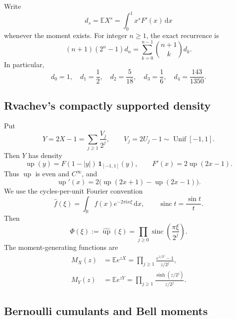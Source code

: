\documentclass[11pt,oneside]{article}
\theoremstyle{definition}
\theoremstyle{remark}
\newcommand{\F}{F}
\newcommand{\Up}{\operatorname{up}}
\newcommand{\E}{\mathbb E}
\newcommand{\R}{\mathbb R}
\newcommand{\dd}{\,\mathrm d}
\newcommand{\ii}{\mathrm i}
\newcommand{\1}{\mathbf 1}
\DeclareMathOperator{\sinc}{sinc}
\begin{document}
Write
\begin{equation}
  d_s=\E X^s=\int_0^1 x^s\F'(x)\dd x
\end{equation}
whenever the moment exists.  For integer \(n\ge1\), the exact recurrence is
\begin{equation}\label{p12:eq:momentrec}
 (n+1)(2^n-1)d_n=\sum_{k=0}^{n-1}\binom{n+1}{k}d_k.
\end{equation}
In particular,
\[
 d_0=1,
 \quad d_1=\frac12,
 \quad d_2=\frac5{18},
 \quad d_3=\frac16,
 \quad d_4=\frac{143}{1350}.
\]

\subsection{Rvachev's compactly supported density}

Put
\begin{equation}\label{p12:eq:Ydef}
 Y=2X-1=\sum_{j\ge1}\frac{V_j}{2^j},
 \qquad V_j=2U_j-1\sim\operatorname{Unif}[-1,1].
\end{equation}
Then \(Y\) has density
\begin{equation}\label{p12:eq:updef}
 \Up(y)=\F(1-|y|)\,\mathbf1_{[-1,1]}(y),
 \qquad
 \F'(x)=2\Up(2x-1).
\end{equation}
Thus \(\Up\) is even and \(C^\infty\), and
\begin{equation}\label{p12:eq:uprefinement}
 \Up'(x)=2\bigl(\Up(2x+1)-\Up(2x-1)\bigr).
\end{equation}
We use the cycles-per-unit Fourier convention
\begin{equation}
 \widehat f(\xi)=\int_{\R}f(x)e^{-2\pi\ii x\xi}\dd x,
 \qquad \sinc t=\frac{\sin t}{t}.
\end{equation}
Then
\begin{equation}\label{p12:eq:phi}
 \Phi(\xi):=\widehat{\Up}(\xi)
 =\prod_{j\ge0}\sinc\!\left(\frac{\pi\xi}{2^j}\right).
\end{equation}
The moment-generating functions are
\begin{align}
 M_X(z)&=\E e^{zX}
 =\prod_{j\ge1}\frac{e^{z/2^j}-1}{z/2^j},\label{p12:eq:MX}\\
 M_Y(z)&=\E e^{zY}
 =\prod_{j\ge1}\frac{\sinh(z/2^j)}{z/2^j}.\label{p12:eq:MY}
\end{align}

\subsection{Bernoulli cumulants and Bell moments}
\end{document}
